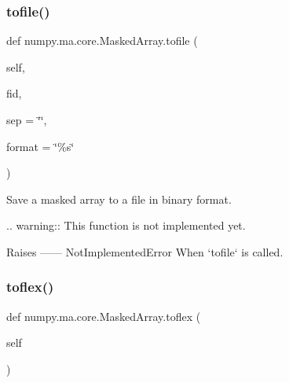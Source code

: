  \mbox{\label{classnumpy_1_1ma_1_1core_1_1MaskedArray_a334d91cce1fdc7d19cea9c7c09524f6d}} 
\subsubsection{\texorpdfstring{tofile()}{tofile()}}
{\footnotesize\ttfamily def numpy.\+ma.\+core.\+Masked\+Array.\+tofile (\begin{DoxyParamCaption}\item[{}]{self,  }\item[{}]{fid,  }\item[{}]{sep = {\ttfamily \char`\"{}\char`\"{}},  }\item[{}]{format = {\ttfamily \char`\"{}\%s\char`\"{}} }\end{DoxyParamCaption})}

\begin{DoxyVerb}Save a masked array to a file in binary format.

.. warning::
  This function is not implemented yet.

Raises
------
NotImplementedError
    When `tofile` is called.\end{DoxyVerb}
 \mbox{\label{classnumpy_1_1ma_1_1core_1_1MaskedArray_a4a28da736f15749fc36f2498415465b9}} 
\subsubsection{\texorpdfstring{toflex()}{toflex()}}
{\footnotesize\ttfamily def numpy.\+ma.\+core.\+Masked\+Array.\+toflex (\begin{DoxyParamCaption}\item[{}]{self }\end{DoxyParamCaption})}

